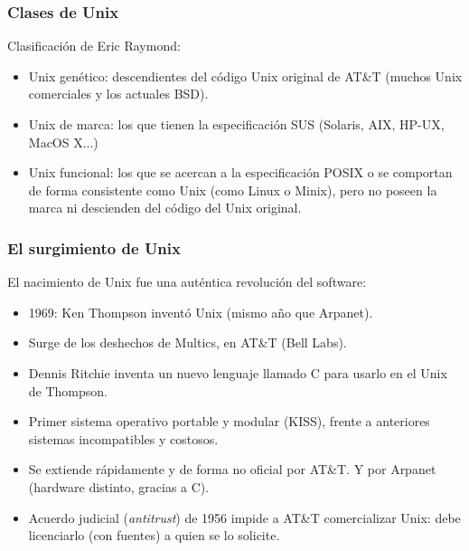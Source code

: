 \documentclass{beamer}
\begin{document}

\begin{frame}
\frametitle{Clases de Unix}

Clasificación de Eric Raymond:

\begin{itemize}
\item \alert{Unix genético}: descendientes del código Unix original de AT\&T (muchos Unix comerciales y los actuales BSD).
\item \alert{Unix de marca}: los que tienen la especificación SUS (Solaris, AIX, HP-UX, MacOS X...)
\item \alert{Unix funcional}: los que se acercan a la especificación POSIX o se comportan de forma consistente como Unix (como Linux o Minix), pero no poseen la marca ni descienden del código del Unix original.
\end{itemize}

\end{frame}



\begin{frame}
\frametitle{El surgimiento de Unix}

El nacimiento de Unix fue una auténtica revolución del software:

\begin{itemize}

\item 1969: Ken Thompson inventó Unix (mismo año que Arpanet).
\item Surge de los deshechos de Multics, en AT\&T (Bell Labs). 
\item Dennis Ritchie inventa un nuevo lenguaje llamado C para usarlo en el Unix de Thompson. 
\item Primer sistema operativo portable y modular (KISS), frente a anteriores sistemas incompatibles y costosos.
\item Se extiende rápidamente y de forma no oficial por AT\&T. Y por Arpanet (hardware distinto, gracias a C).
\item Acuerdo judicial (\textit{antitrust}) de 1956 impide a AT\&T comercializar Unix: debe licenciarlo (con fuentes) a quien se lo solicite.

\end{itemize}

\end{frame}
\end{document}
